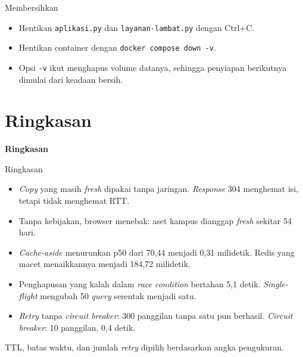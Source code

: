 \documentclass[aspectratio=169, table, 12pt]{beamer}
\begin{document}
\begin{frame}{{\Large Membersihkan}}
  \vspace{12pt}
  \begin{itemize}
    \item Hentikan \texttt{aplikasi.py} dan \texttt{layanan-lambat.py} dengan
          Ctrl+C.
    \item Hentikan container dengan \texttt{docker compose down -v}.
    \item Opsi \texttt{-v} ikut menghapus volume datanya, sehingga penyiapan
          berikutnya dimulai dari keadaan bersih.
  \end{itemize}
\end{frame}

\section{Ringkasan}

\begin{frame}{\hfill}
  \centering
  \Huge{\textbf{Ringkasan}}
\end{frame}

\begin{frame}{{\Large Ringkasan}}
  \begin{itemize}
    \item \textit{Copy} yang masih \textit{fresh} dipakai tanpa jaringan. \textit{Response} 304 menghemat isi,
          tetapi tidak menghemat RTT.
    \item Tanpa kebijakan, browser menebak: aset kampus dianggap \textit{fresh} sekitar
          54 hari.
    \item \textit{Cache-aside} menurunkan p50 dari 70,44 menjadi 0,31
          milidetik. Redis yang macet menaikkannya menjadi 184,72 milidetik.
    \item Penghapusan yang kalah dalam \textit{race condition} bertahan 5,1
          detik. \textit{Single-flight} mengubah 50 \textit{query} serentak menjadi satu.
    \item \textit{Retry} tanpa \textit{circuit breaker}: 300 panggilan tanpa
          satu pun berhasil. \textit{Circuit breaker}: 10 panggilan, 0,4 detik.
  \end{itemize}
  \vspace{4pt}
  {\footnotesize TTL, batas waktu, dan jumlah \textit{retry} dipilih berdasarkan
  angka pengukuran.}
\end{frame}
\end{document}
